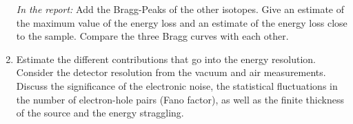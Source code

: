 \begin{enumerate}[label=\textbf{\alph*)}]
	\textit{In the report:} Add the Bragg-Peaks of the other isotopes. Give an estimate of the maximum value of the energy loss and an estimate of the energy loss close to the sample. Compare the three Bragg curves with each other.
	\item Estimate the different contributions that go into the energy resolution. Consider the detector resolution from the vacuum and air measurements. Discuss the significance of the electronic noise, the statistical fluctuations in the number of electron-hole pairs (Fano factor), as well as the finite thickness of the source and the energy straggling.
\end{enumerate}


